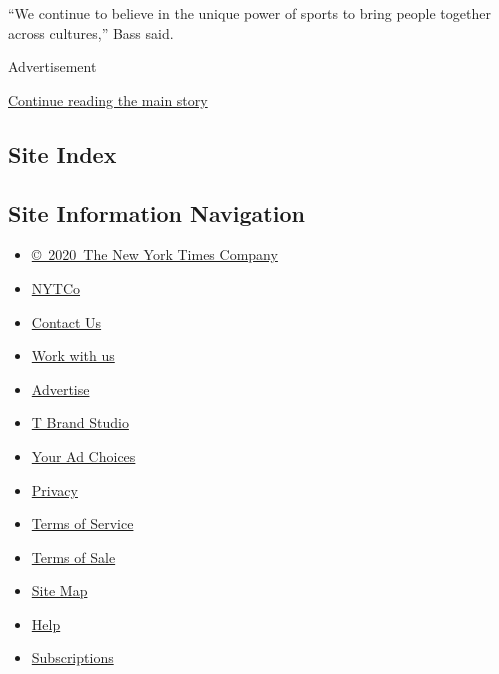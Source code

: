 ``We continue to believe in the unique power of sports to bring people
together across cultures,'' Bass said.

Advertisement

\protect\hyperlink{after-bottom}{Continue reading the main story}

\hypertarget{site-index}{%
\subsection{Site Index}\label{site-index}}

\hypertarget{site-information-navigation}{%
\subsection{Site Information
Navigation}\label{site-information-navigation}}

\begin{itemize}
\tightlist
\item
  \href{https://help.nytimes.com/hc/en-us/articles/115014792127-Copyright-notice}{©~2020~The
  New York Times Company}
\end{itemize}

\begin{itemize}
\tightlist
\item
  \href{https://www.nytco.com/}{NYTCo}
\item
  \href{https://help.nytimes.com/hc/en-us/articles/115015385887-Contact-Us}{Contact
  Us}
\item
  \href{https://www.nytco.com/careers/}{Work with us}
\item
  \href{https://nytmediakit.com/}{Advertise}
\item
  \href{http://www.tbrandstudio.com/}{T Brand Studio}
\item
  \href{https://www.nytimes.com/privacy/cookie-policy\#how-do-i-manage-trackers}{Your
  Ad Choices}
\item
  \href{https://www.nytimes.com/privacy}{Privacy}
\item
  \href{https://help.nytimes.com/hc/en-us/articles/115014893428-Terms-of-service}{Terms
  of Service}
\item
  \href{https://help.nytimes.com/hc/en-us/articles/115014893968-Terms-of-sale}{Terms
  of Sale}
\item
  \href{https://spiderbites.nytimes.com}{Site Map}
\item
  \href{https://help.nytimes.com/hc/en-us}{Help}
\item
  \href{https://www.nytimes.com/subscription?campaignId=37WXW}{Subscriptions}
\end{itemize}
